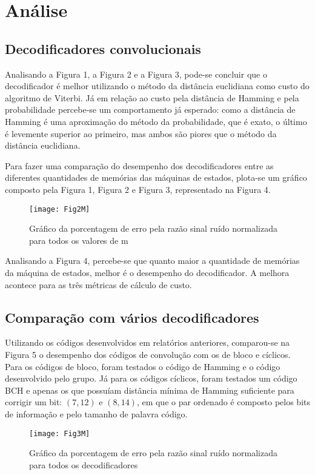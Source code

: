 \section{Análise}

\subsection{Decodificadores convolucionais}

Analisando a Figura 1, a Figura 2 e a Figura 3, pode-se concluir que o decodificador é melhor utilizando o método da distância euclidiana como custo do algoritmo de Viterbi. Já em relação ao custo pela distância de Hamming e pela probabilidade percebe-se um comportamento já esperado: como a distância de Hamming é uma aproximação do método da probabilidade, que é exato, o último é levemente superior ao primeiro, mas ambos são piores que o método da distância euclidiana.

Para fazer uma comparação do desempenho dos decodificadores entre as diferentes quantidades de memórias das máquinas de estados, plota-se um gráfico composto pela Figura 1, Figura 2 e Figura 3, representado na Figura 4.

\begin{figure}[H]
	\centering
	\texttt{[image: Fig2M]}
	\captionsetup{font=scriptsize}
	\caption{Gráfico da porcentagem de erro pela razão sinal ruído normalizada para todos os valores de m}
\end{figure}

Analisando a Figura 4, percebe-se que quanto maior a quantidade de memórias da máquina de estados, melhor é o desempenho do decodificador. A melhora acontece para as três métricas de cálculo de custo.

\subsection{Comparação com vários decodificadores}

Utilizando os códigos desenvolvidos em relatórios anteriores, comparou-se na Figura 5 o desempenho dos códigos de convolução com os de bloco e cíclicos. Para os códigos de bloco, foram testados o código de Hamming e o código desenvolvido pelo grupo. Já para os códigos cíclicos, foram testados um código BCH  e apenas os que possuíam distância mínima de Hamming suficiente para corrigir um bit: $(7,12)$ e $(8,14)$, em que o par ordenado é composto pelos bits de informação e pelo tamanho de palavra código.

\begin{figure}[H]
	\centering
	\texttt{[image: Fig3M]}
	\captionsetup{font=scriptsize}
	\caption{Gráfico da porcentagem de erro pela razão sinal ruído normalizada para todos os decodificadores}
\end{figure}